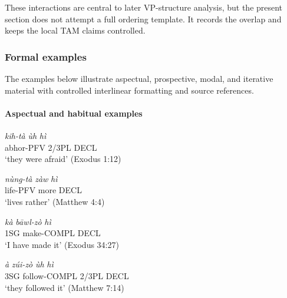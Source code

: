 \documentclass[
  11pt,
  a4paper,
]{article}
\newcommand{\tdimword}[1]{\textit{#1}}
\renewcommand{\textsc}[1]{{\footnotesize\MakeUppercase{#1}}}
\newcommand{\glossquote}[1]{`#1'}
\begin{document}
These interactions are central to later VP-structure analysis, but the
present section does not attempt a full ordering template. It records
the overlap and keeps the local TAM claims controlled.

\subsubsection{Formal examples}\label{formal-examples-1}

The examples below illustrate aspectual, prospective, modal, and
iterative material with controlled interlinear formatting and source
references.

\paragraph{Aspectual and habitual
examples}\label{aspectual-and-habitual-examples}

\begin{exe}
\ex \label{ex:tam-kihta-exod1}
\gll \tdimword{kih-tà} \tdimword{ùh} \tdimword{hì} \\
     abhor-\textsc{pfv} 2/3PL \textsc{decl} \\
\glt \glossquote{they were afraid} (Exodus 1:12)
\end{exe}

\begin{exe}
\ex \label{ex:tam-nungta-matt4}
\gll \tdimword{nùng-tà} \tdimword{zàw} \tdimword{hì} \\
     life-\textsc{pfv} more \textsc{decl} \\
\glt \glossquote{lives rather} (Matthew 4:4)
\end{exe}

\begin{exe}
\ex \label{ex:tam-bawlzo-exod34}
\gll \tdimword{kà} \tdimword{bāwl-zò} \tdimword{hì} \\
     \textsc{1sg} make-\textsc{compl} \textsc{decl} \\
\glt \glossquote{I have made it} (Exodus 34:27)
\end{exe}

\begin{exe}
\ex \label{ex:tam-zuizo-matt7}
\gll \tdimword{à} \tdimword{zúi-zò} \tdimword{ùh} \tdimword{hì} \\
     \textsc{3sg} follow-\textsc{compl} 2/3PL \textsc{decl} \\
\glt \glossquote{they followed it} (Matthew 7:14)
\end{exe}
\end{document}
